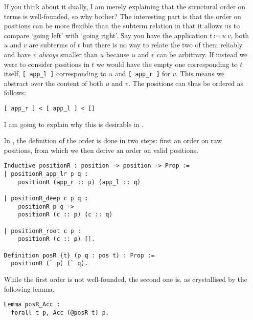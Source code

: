 If you think about it dually, I am merely explaining that the structural order on
terms is well-founded, so why bother?
The interesting part is that the order on positions can be more flexible than
the subterm relation in that it allows us to compare `going left' with
`going right'.
Say you have the application \(t \coloneqq u\ v\), both \(u\) and \(v\) are
subterms of \(t\) but there is no way to relate the two of them reliably and
have \(v\) \emph{always} smaller than \(u\) because \(u\) and \(v\) can be
arbitrary.
If instead we were to consider positions in \(t\) we would have the empty one
corresponding to \(t\) itself, \texttt{[ app_l ]} corresponding to
\(u\) and \texttt{[ app_r ]} for \(v\). This means we abstract over the
content of both \(u\) and \(v\). The positions can thus be ordered as follows:
\begin{verbatim}
[ app_r ] < [ app_l ] < []
\end{verbatim}

I am going to explain why this is desirable in .

In \Coq, the definition of the order is done in two steps: first an order on
raw positions, from which we then derive an order on valid positions.
\begin{verbatim}
Inductive positionR : position -> position -> Prop :=
| positionR_app_lr p q :
    positionR (app_r :: p) (app_l :: q)

| positionR_deep c p q :
    positionR p q ->
    positionR (c :: p) (c :: q)

| positionR_root c p :
    positionR (c :: p) [].

Definition posR {t} (p q : pos t) : Prop :=
  positionR (` p) (` q).
\end{verbatim}

While the first order is not well-founded, the second one is, as crystallised
by the following lemma.
\begin{verbatim}
Lemma posR_Acc :
  forall t p, Acc (@posR t) p.
\end{verbatim}
